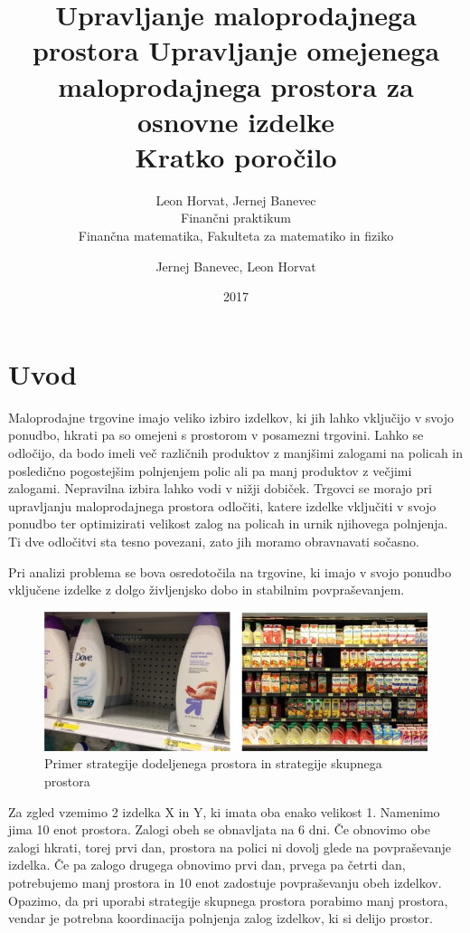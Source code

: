 \documentclass[a4paper]{article}
\title{Upravljanje maloprodajnega prostora}
\author{Leon Horvat, Jernej Banevec \\ Finančni praktikum \\ Finančna matematika, Fakulteta za matematiko in fiziko}
\date{2017}
\begin{document}
\title{%
  Upravljanje omejenega maloprodajnega prostora za osnovne izdelke \\
  \large Kratko poročilo \\}

\author{Jernej Banevec, Leon Horvat}

\maketitle

\pagebreak

\section{Uvod}


Maloprodajne trgovine imajo veliko izbiro izdelkov, ki jih lahko vključijo v svojo ponudbo, hkrati pa so omejeni s prostorom v posamezni trgovini. Lahko se odločijo, da bodo imeli več različnih produktov z manjšimi zalogami na policah in posledično pogostejšim polnjenjem polic ali pa manj produktov z večjimi zalogami. Nepravilna izbira lahko vodi v nižji dobiček. Trgovci se morajo pri upravljanju maloprodajnega prostora odločiti, katere izdelke vključiti v svojo ponudbo ter optimizirati velikost zalog na policah in urnik njihovega polnjenja. Ti dve odločitvi sta tesno povezani, zato jih moramo obravnavati sočasno. 


Pri analizi problema se bova osredotočila na trgovine, ki imajo v svojo ponudbo vključene izdelke z dolgo življenjsko dobo in stabilnim povpraševanjem. 


\vspace{4 mm}

\begin{figure}[h]
\includegraphics [scale = 0.8]{zgled-strategij}
\caption{Primer strategije dodeljenega prostora in strategije skupnega prostora}
\centering
\end{figure}

Za zgled vzemimo 2 izdelka X in Y, ki imata oba enako velikost 1. Namenimo jima 10 enot prostora. Zalogi obeh se obnavljata na 6 dni. Če obnovimo obe zalogi hkrati, torej prvi dan, prostora na polici ni dovolj glede na povpraševanje izdelka. Če pa zalogo drugega obnovimo prvi dan, prvega pa četrti dan, potrebujemo manj prostora in 10 enot zadostuje povpraševanju obeh izdelkov. Opazimo, da pri uporabi strategije skupnega prostora porabimo manj prostora, vendar je potrebna koordinacija polnjenja zalog izdelkov, ki si delijo prostor.
\end{document}
